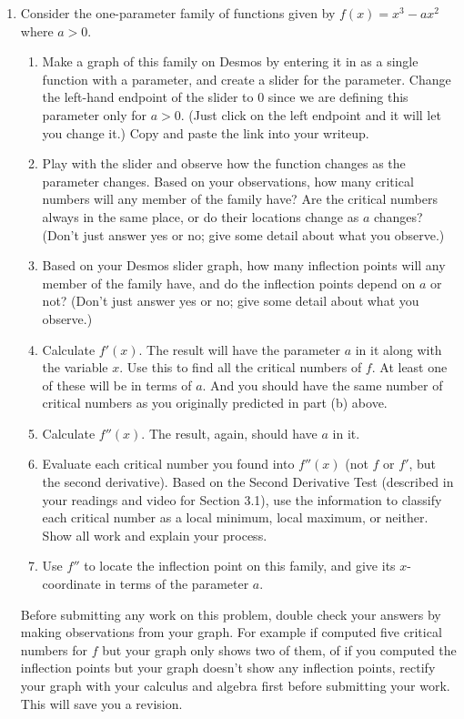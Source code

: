 \documentclass[11pt,letterpaper]{article}
\begin{document}
\begin{enumerate}
    \item Consider the one-parameter family of functions given by $f(x) = x^3 - ax^2$ where $a > 0$.
    \begin{enumerate}
        \item Make a graph of this family on Desmos by entering it in as a single function with a parameter, and create a slider for the parameter. Change the left-hand endpoint of the slider to $0$ since we are defining this parameter only for $a > 0$. (Just click on the left endpoint and it will let you change it.) Copy and paste the link into your writeup. 
        \item Play with the slider and observe how the function changes as the parameter changes. Based on your observations, how many critical numbers will any member of the family have? Are the critical numbers always in the same place, or do their locations change as $a$ changes? (Don't just answer yes or no; give some detail about what you observe.) 
        \item Based on your Desmos slider graph, how many inflection points will any member of the family have, and do the inflection points depend on $a$ or not? (Don't just answer yes or no; give some detail about what you observe.) 
        \item Calculate $f'(x)$. The result will have the parameter $a$ in it along with the variable $x$. Use this to find all the critical numbers of $f$. At least one of these will be in terms of $a$. And you should have the same number of critical numbers as you originally predicted in part (b) above. 
        \item Calculate $f''(x)$. The result, again, should have $a$ in it. 
        \item Evaluate each critical number you found into $f''(x)$ (not $f$ or $f'$, but the second derivative). Based on the Second Derivative Test (described in your readings and video for Section 3.1), use the information to classify each critical number as a local minimum, local maximum, or neither. Show all work and explain your process. 
        \item Use $f''$ to locate the inflection point on this family, and give its $x$-coordinate in terms of the parameter $a$. 
    \end{enumerate}
    
Before submitting any work on this problem, double check your answers by making observations from your graph. For example if computed five critical numbers for $f$ but your graph only shows two of them, of if you computed the inflection points but your graph doesn't show any inflection points, rectify your graph with your calculus and algebra first before submitting your work. This will save you a revision. 


\end{enumerate}
\end{document}

